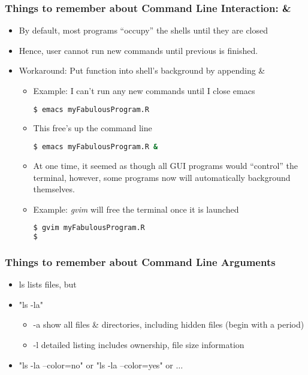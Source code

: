 \documentclass[English]{beamer}
\begin{document}
\begin{frame}
  \frametitle{Things to remember about Command Line Interaction: \&}

  \begin{itemize}
  \item By default, most programs ``occupy'' the shells until they are
    closed
  \item Hence, user cannot run new commands until previous is
    finished. 
  \item Workaround: Put function into shell's background by appending \& 
    
    \begin{itemize}
    \item Example: I can't run any new commands until I close emacs

\begin{lstlisting}[basicstyle={\small},breaklines=true,language=bash]
$ emacs myFabulousProgram.R
\end{lstlisting}  

    \item This free's up the command line
\begin{lstlisting}[basicstyle={\small},breaklines=true,language=bash]
$ emacs myFabulousProgram.R &
\end{lstlisting}  
    \item At one time, it seemed as though all GUI programs would
      ``control'' the terminal, however, some programs now will
      automatically background themselves. 

    \item Example: \emph{gvim} will free the terminal once it is launched
\begin{lstlisting}[basicstyle={\small},breaklines=true,language=bash]
$ gvim myFabulousProgram.R
$ 
\end{lstlisting}  
    \end{itemize}
  \end{itemize}
\end{frame}


\begin{frame}
  \frametitle{Things to remember about Command Line Arguments}
  \begin{itemize}
    \item ls lists files, but
    \item "ls -la"  
    \begin{itemize}
    \item -a  show all files \& directories, including hidden files (begin
      with a period)
    \item -l  detailed listing includes ownership, file size information
    \end{itemize}
   \item "ls -la --color=no" or "ls -la --color=yes" or $\ldots$
  \end{itemize}
\end{frame}
\end{document}
